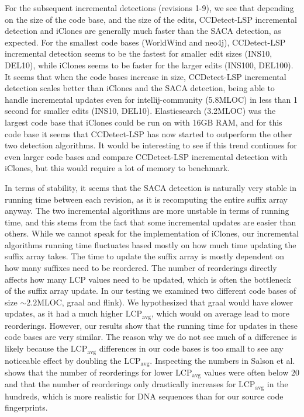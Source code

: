 For the subsequent incremental detections (revisions 1-9), we see that depending on the
size of the code base, and the size of the edits, CCDetect-LSP incremental detection and
iClones are generally much faster than the SACA detection, as expected. For the smallest
code bases (WorldWind and neo4j), CCDetect-LSP incremental detection seems to be the
fastest for smaller edit sizes (INS10, DEL10), while iClones seems to be faster for the
larger edits (INS100, DEL100). It seems that when the code bases increase in size,
CCDetect-LSP incremental detection scales better than iClones and the SACA detection,
being able to handle incremental updates even for intellij-community (5.8MLOC) in less
than 1 second for smaller edits (INS10, DEL10). Elasticsearch (3.2MLOC) was the largest
code base that iClones could be run on with 16GB RAM, and for this code base it seems that
CCDetect-LSP has now started to outperform the other two detection algorithms. It would be
interesting to see if this trend continues for even larger code bases and compare
CCDetect-LSP incremental detection with iClones, but this would require a lot of memory to
benchmark.

In terms of stability, it seems that the SACA detection is naturally very stable in
running time between each revision, as it is recomputing the entire suffix array anyway.
The two incremental algorithms are more unstable in terms of running time, and this stems
from the fact that some incremental updates are easier than others. While we cannot speak
for the implementation of iClones, our incremental algorithms running time fluctuates
based mostly on how much time updating the suffix array takes. The time to update the
suffix array is mostly dependent on how many suffixes need to be reordered. The number of
reorderings directly affects how many LCP values need to be updated, which is often the
bottleneck of the suffix array update. In our testing we examined two different code bases
of size $\sim2.2\text{MLOC}$, graal and flink). We hypothesized that graal would have
slower updates, as it had a much higher $\text{LCP}_\text{avg}$, which would on average
lead to more reorderings. However, our results show that the running time for updates in
these code bases are very similar. The reason why we do not see much of a difference is
likely because the $\text{LCP}_\text{avg}$ differences in our code bases is too small to
see any noticeable effect by doubling the $\text{LCP}_\text{avg}$. Inspecting the numbers
in Salson et al.\cite{DynamicExtendedSuffixArraysReorderings} shows that the number of
reorderings for lower $\text{LCP}_\text{avg}$ values were often below $20$ and that the
number of reorderings only drastically increases for $\text{LCP}_\text{avg}$ in the
hundreds, which is more realistic for DNA sequences than for our source code fingerprints.

